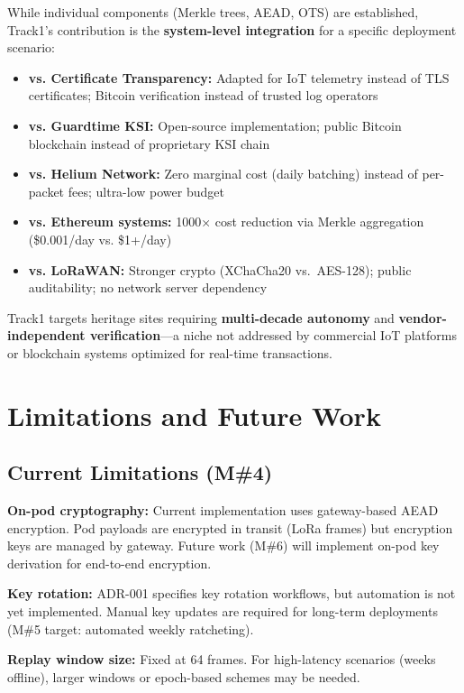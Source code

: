 While individual components (Merkle trees, AEAD, OTS) are established, Track1's contribution is the \textbf{system-level integration} for a specific deployment scenario:

\begin{itemize}[nosep]
    \item \textbf{vs. Certificate Transparency:} Adapted for IoT telemetry instead of TLS certificates; Bitcoin verification instead of trusted log operators
    \item \textbf{vs. Guardtime KSI:} Open-source implementation; public Bitcoin blockchain instead of proprietary KSI chain
    \item \textbf{vs. Helium Network:} Zero marginal cost (daily batching) instead of per-packet fees; ultra-low power budget
    \item \textbf{vs. Ethereum systems:} 1000× cost reduction via Merkle aggregation (\$0.001/day vs. \$1+/day)
    \item \textbf{vs. LoRaWAN:} Stronger crypto (XChaCha20 vs.\ AES-128); public auditability; no network server dependency
\end{itemize}

Track1 targets heritage sites requiring \textbf{multi-decade autonomy} and \textbf{vendor-independent verification}—a niche not addressed by commercial IoT platforms or blockchain systems optimized for real-time transactions.

\section{Limitations and Future Work}

\subsection{Current Limitations (M\#4)}

\textbf{On-pod cryptography:} Current implementation uses gateway-based AEAD encryption.
Pod payloads are encrypted in transit (LoRa frames) but encryption keys are managed by gateway. Future work (M\#6) will implement on-pod key derivation for end-to-end encryption.

\textbf{Key rotation:} ADR-001 specifies key rotation workflows, but automation is not yet implemented. Manual key updates are required for long-term deployments (M\#5 target: automated weekly ratcheting).

\textbf{Replay window size:} Fixed at 64 frames. For high-latency scenarios (weeks offline), larger windows or epoch-based schemes may be needed.

